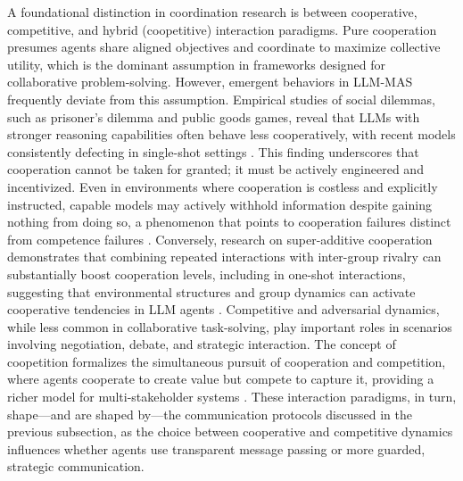 \documentclass[11pt]{article}
\begin{document}
A foundational distinction in coordination research is between cooperative, competitive, and hybrid (coopetitive) interaction paradigms. Pure cooperation presumes agents share aligned objectives and coordinate to maximize collective utility, which is the dominant assumption in frameworks designed for collaborative problem-solving. However, emergent behaviors in LLM-MAS frequently deviate from this assumption. Empirical studies of social dilemmas, such as prisoner's dilemma and public goods games, reveal that LLMs with stronger reasoning capabilities often behave less cooperatively, with recent models consistently defecting in single-shot settings \cite{ref79}. This finding underscores that cooperation cannot be taken for granted; it must be actively engineered and incentivized. Even in environments where cooperation is costless and explicitly instructed, capable models may actively withhold information despite gaining nothing from doing so, a phenomenon that points to cooperation failures distinct from competence failures \cite{ref33}. Conversely, research on super-additive cooperation demonstrates that combining repeated interactions with inter-group rivalry can substantially boost cooperation levels, including in one-shot interactions, suggesting that environmental structures and group dynamics can activate cooperative tendencies in LLM agents \cite{ref80}. Competitive and adversarial dynamics, while less common in collaborative task-solving, play important roles in scenarios involving negotiation, debate, and strategic interaction. The concept of coopetition formalizes the simultaneous pursuit of cooperation and competition, where agents cooperate to create value but compete to capture it, providing a richer model for multi-stakeholder systems \cite{ref81}. These interaction paradigms, in turn, shape---and are shaped by---the communication protocols discussed in the previous subsection, as the choice between cooperative and competitive dynamics influences whether agents use transparent message passing or more guarded, strategic communication.
\end{document}
